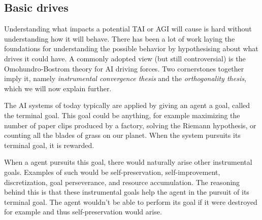 \documentclass[12pt,A4]{report}
\theoremstyle{definition}
\begin{document}

\subsection{Basic drives}

Understanding what impacts a potential TAI or AGI will cause is hard without understanding how it will behave. There has been a lot of work laying the foundations for understanding the possible behavior by hypothesising about what drives it could have. A commonly adopted view (but still controversial\autocite{Müller Cannon}) is the Omohundro-Bostrom theory for AI driving forces. Two cornerstones together imply it\autocite{O Häggstom}, namely \textit{instrumental convergence thesis} and the \textit{orthogonality thesis}, which we will now explain further.

The AI systems of today typically are applied by giving an agent a goal, called the terminal goal. This goal could be anything, for example maximizing the number of paper clips produced by a factory, solving the Riemann hypothesis, or counting all the blades of grass on our planet. When the system pursuits its terminal goal, it is rewarded.

When a agent pursuits this goal, there would naturally arise other instrumental goals. Examples of such would be self-preservation, self-improvement, discretization, goal perseverance, and resource accumulation\autocite{Omohundro}. The reasoning behind this is that these instrumental goals help the agent in the pursuit of its terminal goal. The agent wouldn't be able to perform its goal if it were destroyed for example and thus self-preservation would arise. 
\end{document}
